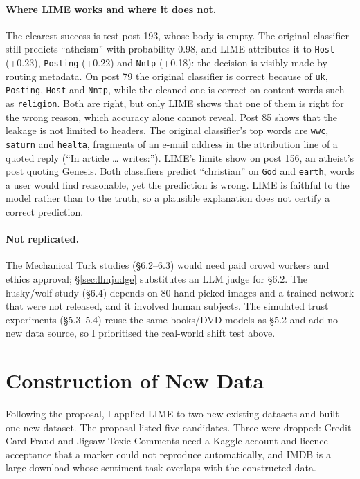 \documentclass[11pt]{article}
\newcommand{\tok}[1]{\texttt{#1}}
\begin{document}
\paragraph{Where LIME works and where it does not.} The clearest success is test post 193, whose body is empty. The original classifier still predicts ``atheism'' with probability 0.98, and LIME attributes it to \tok{Host} (+0.23), \tok{Posting} (+0.22) and \tok{Nntp} (+0.18): the decision is visibly made by routing metadata. On post 79 the original classifier is correct because of \tok{uk}, \tok{Posting}, \tok{Host} and \tok{Nntp}, while the cleaned one is correct on content words such as \tok{religion}. Both are right, but only LIME shows that one of them is right for the wrong reason, which accuracy alone cannot reveal. Post 85 shows that the leakage is not limited to headers. The original classifier's top words are \tok{wwc}, \tok{saturn} and \tok{healta}, fragments of an e-mail address in the attribution line of a quoted reply (``In article \ldots{} writes:''). LIME's limits show on post 156, an atheist's post quoting Genesis. Both classifiers predict ``christian'' on \tok{God} and \tok{earth}, words a user would find reasonable, yet the prediction is wrong. LIME is faithful to the model rather than to the truth, so a plausible explanation does not certify a correct prediction.

\paragraph{Not replicated.} The Mechanical Turk studies (\S6.2--6.3) would need paid crowd workers and ethics approval; \S\ref{sec:llmjudge} substitutes an LLM judge for \S6.2. The husky/wolf study (\S6.4) depends on 80 hand-picked images and a trained network that were not released, and it involved human subjects. The simulated trust experiments (\S5.3--5.4) reuse the same books/DVD models as \S5.2 and add no new data source, so I prioritised the real-world shift test above.

\section{Construction of New Data}
\label{sec:newdata}

Following the proposal, I applied LIME to two new existing datasets and built one new dataset. The proposal listed five candidates. Three were dropped: Credit Card Fraud and Jigsaw Toxic Comments need a Kaggle account and licence acceptance that a marker could not reproduce automatically, and IMDB is a large download whose sentiment task overlaps with the constructed data.
\end{document}
